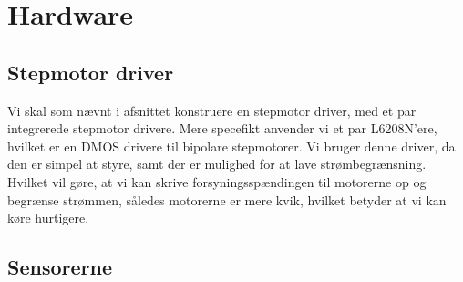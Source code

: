 \chapter[Implementering af hardware]{Hardware}


\section{Stepmotor driver}
Vi skal som nævnt i afsnittet  konstruere en
stepmotor driver, med et par integrerede stepmotor drivere. Mere
specefikt anvender vi et par L6208N'ere, hvilket er en DMOS drivere
til bipolare stepmotorer. Vi bruger denne driver, da den er simpel at
styre, samt der er mulighed for at lave strømbegrænsning. Hvilket vil
gøre, at vi kan skrive forsyningsspændingen til motorerne op og
begrænse strømmen, således motorerne er mere kvik, hvilket betyder at
vi kan køre hurtigere.



\section{Sensorerne}


